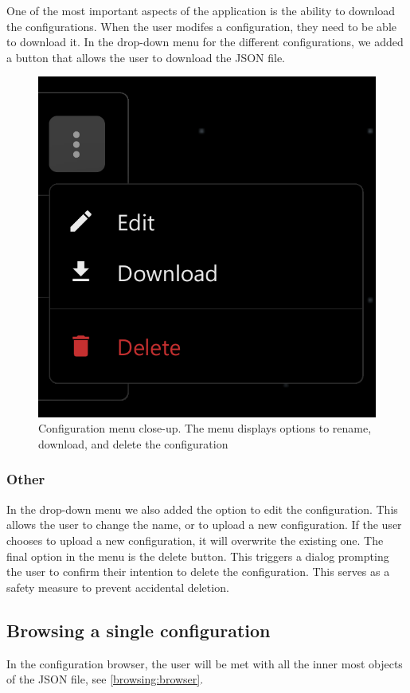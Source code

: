One of the most important aspects of the application is the ability to download the configurations. When the user modifes a configuration, they need to be able to download it. In the drop-down menu for the different configurations, we added a button that allows the user to download the JSON file. 
\begin{figure}[!ht]
   \begin{minipage}{1\textwidth}
    \centering
    \includegraphics[width=.3\textwidth]{Figures/configurations-page/download-crop.pdf}
     \caption[Config menu - rename, download, delete options]{Configuration menu close-up. The menu displays options to rename, download, and delete the configuration}
     \label{download:configuration}
   \end{minipage}\hfill
\end{figure}

\subsubsection{Other}

In the drop-down menu we also added the option to edit the configuration. This allows the user to change the name, or to upload a new configuration. If the user chooses to upload a new configuration, it will overwrite the existing one.
The final option in the menu is the delete button. This triggers a dialog prompting the user to confirm their intention to delete the configuration. This serves as a safety measure to prevent accidental deletion.

\subsection{Browsing a single configuration}

In the configuration browser, the user will be met with all the inner most objects of the JSON file, see \autoref{browsing:browser}.

